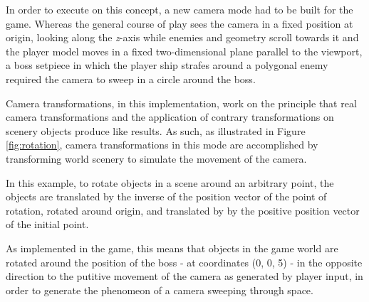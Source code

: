 \documentclass{article}
\begin{document}

In order to execute on this concept, a new camera mode had to be built for the game.
Whereas the general course of play sees the camera in a fixed position at origin, looking
along the \textit{z}-axis while enemies and geometry scroll towards it and the player
model moves in a fixed two-dimensional plane parallel to the viewport, a boss setpiece in
which the player ship strafes around a polygonal enemy required the camera to sweep in a 
circle around the boss.

Camera transformations, in this implementation, work on the principle that real camera
transformations and the application of contrary transformations on scenery objects
produce like results. As such, as illustrated in Figure \ref{fig:rotation}, camera transformations
in this mode are accomplished by transforming world scenery to simulate the movement of the camera.

In this example, to rotate objects in a scene around an arbitrary point, the objects are
translated by the inverse of the position vector of the point of rotation, rotated around
origin, and translated by by the positive position vector of the initial point.

As implemented in the game, this means that objects in the game world are rotated around
the position of the boss - at coordinates (0, 0, 5) - in the opposite direction to the
putitive movement of the camera as generated by player input, in order to generate the
phenomeon of a camera sweeping through space.
\end{document}
